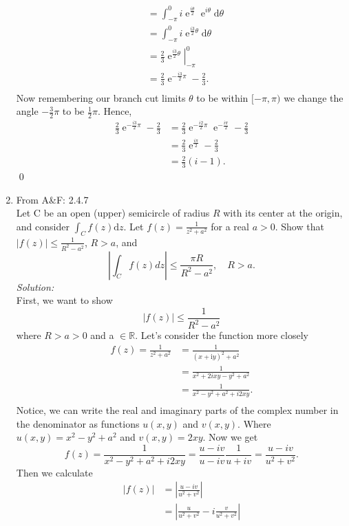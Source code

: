\documentclass[10pt]{amsart}
\newcommand{\D}{\mathrm{d}}
\newcommand{\I}{\mathrm{i}}
\DeclareMathOperator{\E}{e}
\theoremstyle{nonumberplain}
\begin{document}
\begin{enumerate}[label={\bf {\arabic*}:}]
\begin{align*}
	&= \int_{-\pi}^{0} i\E^{\frac{i\theta}{2}} \E^{i\theta} \D \theta \\
	&= \int_{-\pi}^{0} i\E^{\frac{i3}{2}\theta} \D \theta \\
	&= \left. \frac 2 3 \E^{\frac{i3}{2}\theta} \right|_{-\pi}^{0} \\
	&= \frac 2 3 \E^{ - \frac{i3}{2} \pi} - \frac 2 3. \\
\end{align*}
Now remembering our branch cut limits $\theta$ to be within $[-\pi, \pi)$ we change the angle $-\frac 3 2 \pi$ to be $\frac 1 2 \pi$.
Hence,
\begin{align*}
\frac 2 3 \E^{ - \frac{i3}{2} \pi} - \frac 2 3 &= \frac 2 3 \E^{ - \frac{i2}{2} \pi} \E^{ - \frac{i\pi}{2}} - \frac 2 3 \\
	&= \frac 2 3 \E^{ \frac{i\pi}{2}} - \frac 2 3 \\
	&= \frac 2 3 \left( i - 1\right).
\end{align*}
\qed
\\
\item From A\&F: 2.4.7 \\
Let C be an open (upper) semicircle of radius $R$ with its center at the origin, and consider $\int_C f(z) \D z$.
 Let $f(z) = \frac{1}{z^2 + a^2}$ for a real $a > 0$.
Show that $\left| f(z) \right| \leq \frac{1}{R^2 - a^2}$, $R > a$, and
$$
\left| \int_C f(z) dz \right| \leq \frac{\pi R}{R^2 - a^2}, \quad R > a.
$$
\textit{Solution:} \\
First, we want to show
$$
\left| f(z) \right| \leq \frac{1}{R^2 - a^2}
$$
where $R > a > 0$ and a $\in \mathbb R$.
Let's consider the function more closely
\begin{align*}
f(z) =  \frac{1}{z^2 + a^2} &= \frac{1}{(x + \I y)^2 + a^2} \\
	&= \frac{1}{x^2 + 2ixy - y^2 + a^2} \\
	&= \frac{1}{x^2 - y^2 + a^2 + i2xy }. \\
\end{align*}
Notice, we can write the real and imaginary parts of the complex number in the denominator as functions $u(x, y)$ and $v(x, y)$.
Where $u(x, y) = x^2 - y^2 + a^2$ and $v(x, y) = 2xy$.
Now we get 
$$
f(z) = \frac{1}{x^2 - y^2 + a^2 + i2xy }	 = \frac{u - iv }{u - iv }\frac{1}{u + iv } = \frac{u - iv }{u^2 + v^2 }.
$$
Then we calculate
\begin{align*}
\left| f(z) \right| &= \left| \frac{u - iv }{u^2 + v^2 } \right| \\
	&= \left| \frac{u }{u^2 + v^2 } - i\frac{v}{u^2 + v^2 } \right| \\

\end{align*}
\end{enumerate}
\end{document}
